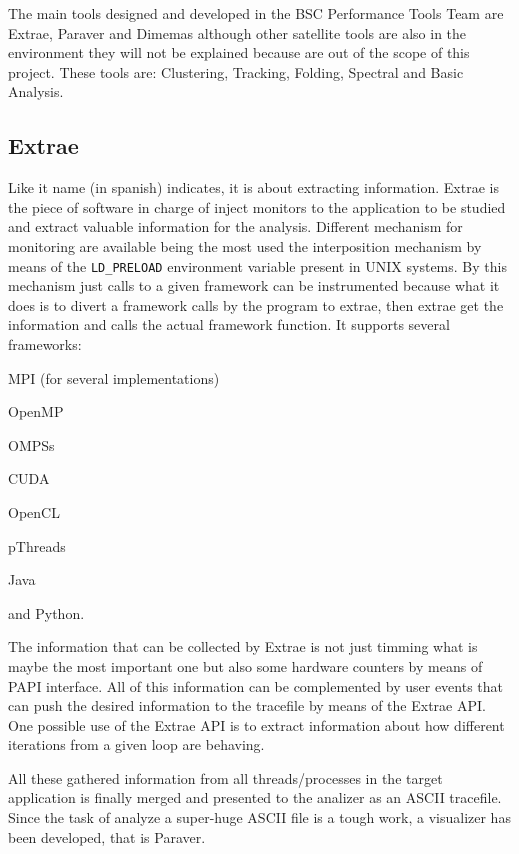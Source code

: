 The main tools designed and developed in the BSC Performance Tools Team are 
Extrae, Paraver and Dimemas although other satellite tools are also in the environment they will not be
explained because are out of the scope of this project. These tools are: 
Clustering, Tracking, Folding, Spectral and Basic Analysis.

\subsection{Extrae}

Like it name (in spanish) indicates, it is about extracting information. Extrae is
the piece of software in charge of inject monitors to the application to
be studied and
extract valuable information for the analysis. Different mechanism for
monitoring are available being the most used the interposition mechanism by
means of the {\tt LD\_PRELOAD} environment variable present in UNIX systems.
By this mechanism just calls to a given framework can be instrumented because
what it does is to divert a framework calls by the program to extrae, then extrae get
the information and calls the actual framework function. It supports several frameworks: 
\begin{enumerate*}[label=(\roman*)]
  \item MPI (for several implementations)
  \item OpenMP
  \item OMPSs
  \item CUDA
  \item OpenCL
  \item pThreads
  \item Java
  \item and Python.
\end{enumerate*}

The information that can be collected by Extrae is not just timming what is maybe
the most important one but also some hardware counters by means of PAPI
interface. All of this information can be complemented by user events that can
push the desired information to the tracefile by means of the Extrae API. One
possible use of the Extrae API is to extract information about how different
iterations from a given loop are behaving.

All these gathered information from all threads/processes in the target
application is finally merged and presented to the analizer as an ASCII
tracefile. Since the task of analyze a super-huge ASCII file is a tough work, a
visualizer has been developed, that is Paraver.

